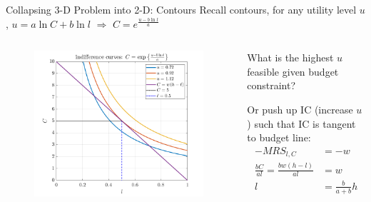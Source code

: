 \documentclass[11pt,aspectratio=169,usenames,dvipsnames]{beamer}
\let\tempone\itemize
\let\temptwo\enditemize
\renewenvironment{itemize}{\tempone\addtolength{\itemsep}{\fill}}{\temptwo}
\begin{document}
\begin{frame}{Collapsing 3-D Problem into 2-D: Contours}
\label{slide:Collapsing_3_D_Problem_into_2_D__Contours}
Recall \alert{contours}, for any utility level $ u $, $ u = a \ln C + b \ln l $ $ \Rightarrow  $ $ C = e^{ \frac{u - b \ln l}{a}} $
\begin{columns}
    \begin{column}{0.6\textwidth}
        \begin{figure}
            \includegraphics[width=.9\textwidth]{./figures/UtilityBudget2DContour.png}
        \end{figure}
    \end{column}
    \begin{column}{0.4\textwidth}
        \begin{itemize}
            \item \alert{What is the highest $ u $ feasible given budget constraint}?
            \item Or push up IC (increase $ u $) such that IC is tangent to budget line:
                \begin{align*}
                   - MRS_{l, C}
                       & = -w
                   \\
                    \frac{b C}{a l} = \frac{b w ( h-l )}{a l}
                        & = w
                    \\
                    l
                        & = \frac{b}{a+b}h
                    \\
                \end{align*}
        \end{itemize}
    \end{column}
\end{columns}

\end{frame}
\end{document}
